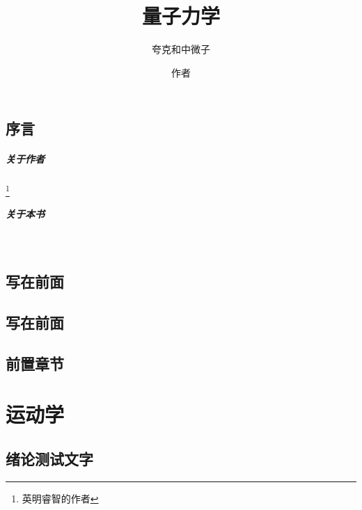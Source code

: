 \documentclass[color=BLUE]{textbook-cn}%
\title{量子力学}
\subtitle{夸克和中微子}
\author{作者}
\begin{document}
\maketitle


\frontmatter



\chapter*{序言}
\subsubsection{关于作者}\footnote{英明睿智的作者}
\lipsum
\subsubsection{关于本书}


\begin{center}
\scalebox{8}{\TextBook}\\[7.5pt]
\scalebox{8}{\TextBook*}
\end{center}

\chapter*{写在前面}
\lipsum


\chapter{写在前面}
\lipsum



\printnomenclature


\tableofcontents*

\listoffigures*


\listoftables*

\mainmatter
\tcbstartrecording






\chapter{前置章节}
\lipsum\lipsum\lipsum


\part{运动学}



\chapter{绪论\quad 测试文字}
\end{document}
